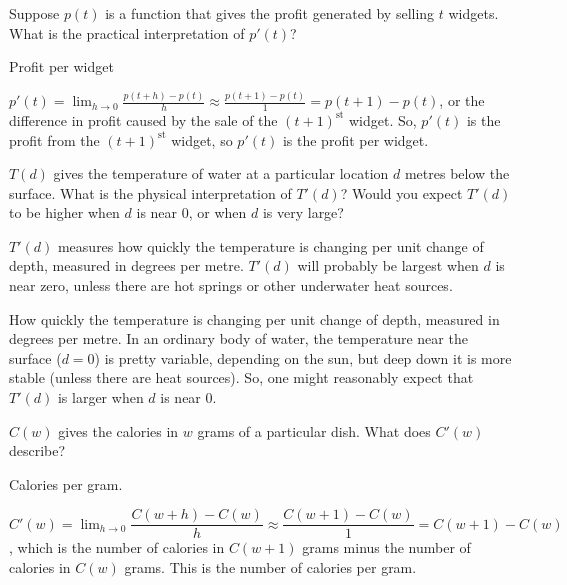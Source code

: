 \begin{question}Suppose $p(t)$ is a function that gives the profit generated by selling $t$ widgets. What is the practical interpretation of $p'(t)$?
\end{question}
\begin{answer} Profit per widget
\end{answer}
\begin{solution}
$p'(t) = \displaystyle\lim_{h \rightarrow 0}\frac{p(t+h)-p(t)}{h} \approx \frac{p(t+1)-p(t)}{1} = p(t+1)-p(t)$, or the difference in profit caused by the sale of the $(t+1)^{\mathrm{st}}$ widget. So, $p'(t)$ is the profit from the $(t+1)^{\mathrm{st}}$ widget, so $p'(t)$ is the profit per widget.
\end{solution}

\begin{question} $T(d)$ gives the temperature of water at a particular location $d$ metres below the surface. What is the physical interpretation of $T'(d)$? Would you expect $T'(d)$ to be higher when $d$ is near 0, or when $d$ is very large?
\end{question}
\begin{answer} $T'(d)$ measures how quickly the temperature is changing per unit change of depth, measured in degrees per metre. $T'(d)$ will probably be largest when $d$ is near zero, unless there are hot springs or other underwater heat sources.
\end{answer}
\begin{solution} How quickly the temperature is changing per unit change of depth, measured in degrees per metre. In an ordinary body of water, the temperature near the surface ($d=0$) is pretty variable, depending on the sun, but deep down it is more stable (unless there are heat sources). So, one might reasonably expect that $T'(d)$ is larger when $d$ is near 0.
\end{solution}

\begin{question}$C(w)$ gives the calories in $w$ grams of a particular dish. What does $C'(w)$ describe?
\end{question}
\begin{answer} Calories per gram.
\end{answer}
\begin{solution} $C'(w)=\displaystyle\lim_{h \rightarrow 0} \dfrac{C(w+h)-C(w)}{h} \approx \dfrac{C(w+1)-C(w)}{1}=C(w+1)-C(w)$, which is the number of calories in $C(w+1)$ grams minus the number of calories in $C(w)$ grams. This is the number of calories per gram.
\end{solution}

